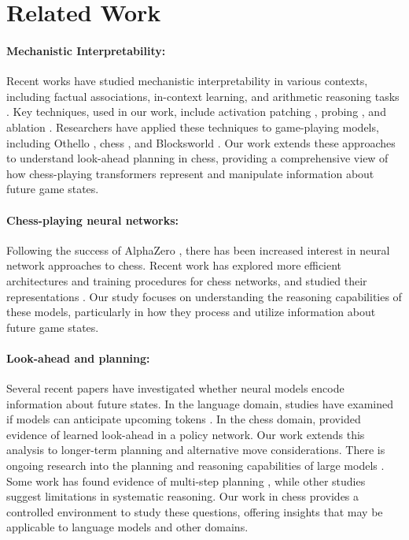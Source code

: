 \documentclass{article}
\begin{document}
\section{Related Work}

\paragraph{Mechanistic Interpretability:} Recent works have studied mechanistic interpretability in various contexts, including factual associations, in-context learning, and arithmetic reasoning tasks \citep{geva2023dissecting,wang2023label}. Key techniques, used in our work, include activation patching \citep{vig2020investigating,meng2023locating,geiger2021causal,li2023inference}, probing \citep{hewitt2019designing,gurnee2023finding,dai2022knowledge}, and ablation \citep{mcgrath2023hydra}. Researchers have applied these techniques to game-playing models, including Othello \citep{li2022emergent,nanda2023emergent}, chess \citep{karvonenEmergentWorldModels2024}, and Blocksworld \citep{wang2024alpine}. Our work extends these approaches to understand look-ahead planning in chess, providing a comprehensive view of how chess-playing transformers represent and manipulate information about future game states.

\paragraph{Chess-playing neural networks:} Following the success of AlphaZero \citep{AlphaZero}, there has been increased interest in neural network approaches to chess. Recent work has explored more efficient architectures \citep{czech2023representation} and training procedures \citep{ruoss2024grandmasterlevel} for chess networks, and studied their representations \citep{karvonenEmergentWorldModels2024}. Our study focuses on understanding the reasoning capabilities of these models, particularly in how they process and utilize information about future game states.
\paragraph{Look-ahead and planning:} Several recent papers have investigated whether neural models encode information about future states. In the language domain, studies have examined if models can anticipate upcoming tokens \citep{pal2023future,wu2024language}. In the chess domain, \citet{jenner2024evidence} provided evidence of learned look-ahead in a policy network. Our work extends this analysis to longer-term planning and alternative move considerations. There is ongoing research into the planning and reasoning capabilities of large models \citep{men2024unlocking,yao2024tree,hao2023reasoning,ivanitskiyStructuredWorldRepresentations2023, garriga-alonsoPlanningBehaviorRecurrent2024}. Some work has found evidence of multi-step planning \citep{chen2021decision}, while other studies suggest limitations in systematic reasoning. Our work in chess provides a controlled environment to study these questions, offering insights that may be applicable to language models and other domains.
\end{document}
